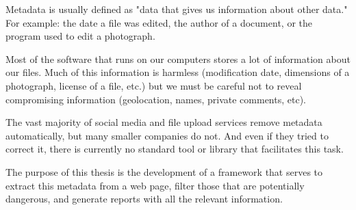 Metadata is usually defined as "data that gives us information about other data." For example: the date a file was edited, the author of a document, or the program used to edit a photograph.

Most of the software that runs on our computers stores a lot of information about our files. Much of this information is harmless (modification date, dimensions of a photograph, license of a file, etc.) but we must be careful not to reveal compromising information (geolocation, names, private comments, etc).

The vast majority of social media and file upload services remove metadata automatically, but many smaller companies do not. And even if they tried to correct it, there is currently no standard tool or library that facilitates this task.

The purpose of this thesis is the development of a framework that serves to extract this metadata from a web page, filter those that are potentially dangerous, and generate reports with all the relevant information.

